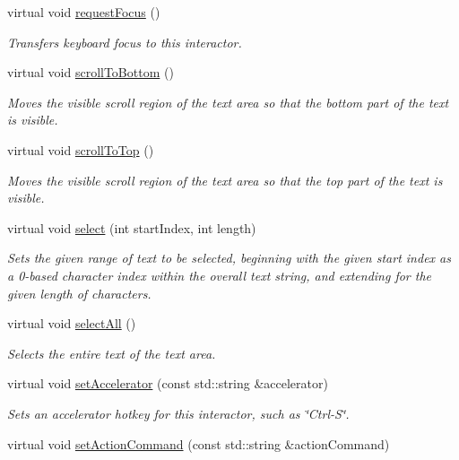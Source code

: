 \begin{DoxyCompactItemize}
virtual void \mbox{\hyperlink{classGInteractor_a519fb2ac767f8b2febbb50b898b8c8cb}{request\+Focus}} ()
\begin{DoxyCompactList}\small\item\em Transfers keyboard focus to this interactor. \end{DoxyCompactList}\item 
virtual void \mbox{\hyperlink{classGTextArea_ad4c9b6140b529865a6cdeed37a339237}{scroll\+To\+Bottom}} ()
\begin{DoxyCompactList}\small\item\em Moves the visible scroll region of the text area so that the bottom part of the text is visible. \end{DoxyCompactList}\item 
virtual void \mbox{\hyperlink{classGTextArea_a9eacfcf7c186936ed957dd1c8a9c6b64}{scroll\+To\+Top}} ()
\begin{DoxyCompactList}\small\item\em Moves the visible scroll region of the text area so that the top part of the text is visible. \end{DoxyCompactList}\item 
virtual void \mbox{\hyperlink{classGTextArea_aaeb1320c0553d0d2b8081b750f59a34a}{select}} (int start\+Index, int length)
\begin{DoxyCompactList}\small\item\em Sets the given range of text to be selected, beginning with the given start index as a 0-\/based character index within the overall text string, and extending for the given length of characters. \end{DoxyCompactList}\item 
virtual void \mbox{\hyperlink{classGTextArea_ab6658ed404200bd7aaca5629db064645}{select\+All}} ()
\begin{DoxyCompactList}\small\item\em Selects the entire text of the text area. \end{DoxyCompactList}\item 
virtual void \mbox{\hyperlink{classGInteractor_ad15f102f62e2960576012f1aa0ba4b2e}{set\+Accelerator}} (const std\+::string \&accelerator)
\begin{DoxyCompactList}\small\item\em Sets an accelerator hotkey for this interactor, such as \char`\"{}\+Ctrl-\/\+S\char`\"{}. \end{DoxyCompactList}\item 
virtual void \mbox{\hyperlink{classGInteractor_a4b5843fe3030e038a1ba54cc03389bcf}{set\+Action\+Command}} (const std\+::string \&action\+Command)

\end{DoxyCompactItemize}
